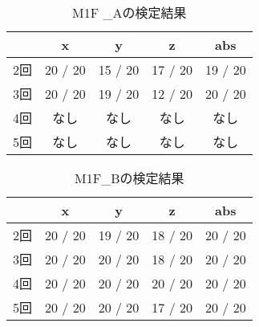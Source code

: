 \begin{table}[tb]
    \caption{M1F _Aの検定結果}
    \vspace{0.5cm}
    \centering
    \begin{tabular}{|c|c|c|c|c|}
        \hline
        \diagbox{}{} & x & y & z & abs \\\hline
        2回 & 20 / 20 & 15 / 20 & 17 / 20 & 19 / 20 \\
        3回 & 20 / 20 & 19 / 20 & 12 / 20 & 20 / 20 \\
        4回 & なし & なし & なし & なし \\
        5回 & なし & なし & なし & なし \\
        \hline
    \end{tabular}
\end{table}
\begin{table}[tb]
    \caption{M1F_Bの検定結果}
    \vspace{0.5cm}
    \centering
    \begin{tabular}{|c|c|c|c|c|}
        \hline
        \diagbox{}{} & x & y & z & abs \\\hline
        2回 & 20 / 20 & 19 / 20 & 18 / 20 & 20 / 20 \\
        3回 & 20 / 20 & 20 / 20 & 18 / 20 & 20 / 20 \\
        4回 & 20 / 20 & 20 / 20 & 20 / 20 & 20 / 20 \\
        5回 & 20 / 20 & 20 / 20 & 17 / 20 & 20 / 20 \\
        \hline
    \end{tabular}
\end{table}

